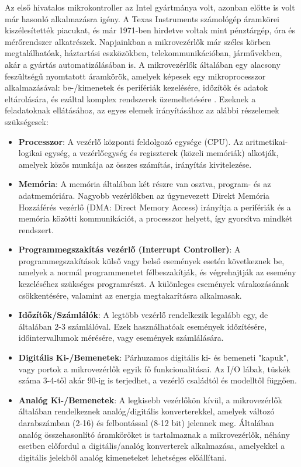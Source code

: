 Az első hivatalos mikrokontroller az Intel gyártmánya volt, azonban előtte is volt már hasonló alkalmazásra igény. A Texas Instruments számológép áramkörei kiszélesítették piacukat, és már 1971-ben hirdetve voltak mint pénztárgép, óra és mérőrendszer alkatrészek. Napjainkban a mikrovezérlők már széles körben megtalálhatóak, háztartási eszközökben, telekommunikációban, járművekben, akár a gyártás automatizálásában is. A mikrovezérlők általában egy alacsony feszültségű nyomtatott áramkörök, amelyek képesek egy mikroprocesszor alkalmazásával: be-/kimenetek és perifériák kezelésére, időzítők és adatok eltárolására, és ezáltal komplex rendszerek üzemeltetésére \cite{Gridling2007}. Ezeknek a feladatoknak ellátásához, az egyes elemek irányításához az alábbi részelemek szükségesek:
\begin{itemize}
	\item \textbf{Processzor}: A vezérlő központi feldolgozó egysége (CPU). Az aritmetikai-logikai egység, a vezérlőegység és regiszterek (közeli memóriák) alkotják, amelyek közös munkája az összes számítás, irányítás kivitelezése.
	\item \textbf{Memória}: A memória általában két részre van osztva, program- és az adatmemóriára. Nagyobb vezérlőkben az úgynevezett Direkt Memória Hozzáférés vezérlő (DMA: Direct Memory Access) irányítja a perifériák és a memória közötti kommunikációt, a processzor helyett, így gyorsítva mindkét rendszert.
	\item \textbf{Programmegszakítás vezérlő (Interrupt Controller)}: A programmegszakítások külső vagy belső események esetén következnek be, amelyek a normál programmenetet félbeszakítják, és végrehajtják az esemény kezeléséhez szükséges programrészt. A különleges események várakozásának csökkentésére, valamint az energia megtakarításra alkalmasak.
	\item \textbf{Időzítők/Számlálók}: A legtöbb vezérlő rendelkezik legalább egy, de általában 2-3 számlálóval. Ezek használhatóak események időzítésére, időintervallumok mérésére, vagy események számlálására.
	\item \textbf{Digitális Ki-/Bemenetek}: Párhuzamos digitális ki- és bemeneti "kapuk", vagy portok a mikrovezérlők egyik fő funkcionalitásai. Az I/O lábak, tüskék száma 3-4-től akár 90-ig is terjedhet, a vezérlő családtól és modelltől függően.
	\item \textbf{Analóg Ki-/Bemenetek}: A legkisebb vezérlőkön kívül, a mikrovezérlők általában rendelkeznek analóg/digitális konverterekkel, amelyek változó darabszámban (2-16) és felbontással (8-12 bit) jelennek meg. Általában analóg összehasonlító áramköröket is tartalmaznak a mikrovezérlők, néhány esetben előfordul a digitális/analóg konverterek alkalmazása, amelyekkel a digitális jelekből analóg kimeneteket lehetséges előállítani.

\end{itemize}
